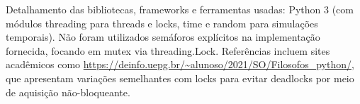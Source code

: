 Detalhamento das bibliotecas, frameworks e ferramentas usadas: Python 3 (com módulos threading para threads e locks, time e random para simulações temporais). Não foram utilizados semáforos explícitos na implementação fornecida, focando em mutex via threading.Lock. Referências incluem sites acadêmicos como \url{https://deinfo.uepg.br/~alunoso/2021/SO/Filosofos_python/}, que apresentam variações semelhantes com locks para evitar deadlocks por meio de aquisição não-bloqueante.